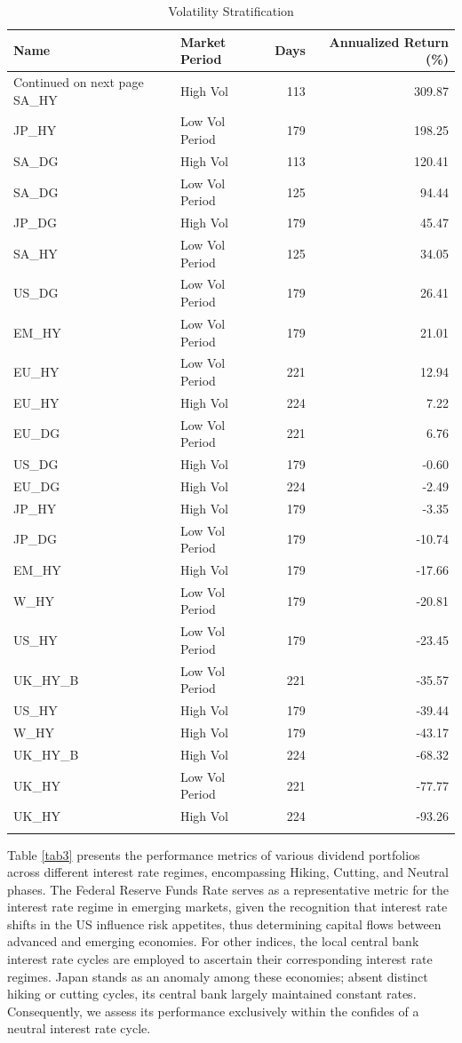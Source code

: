 \documentclass[12pt,preprint, authoryear]{elsarticle}
\numberwithin{equation}{section}
\numberwithin{figure}{section}
\numberwithin{table}{section}
\begin{document}
\begingroup\fontsize{12pt}{13pt}\selectfont
\begin{longtable}{llrr}
  \toprule
Name & Market Period & Days & Annualized Return (\%) \\ 
  \hline 
\endhead 
\hline 
{\footnotesize Continued on next page} 
\endfoot 
\endlastfoot 
 \midrule
SA\_HY & High Vol & 113 & 309.87 \\ 
  JP\_HY & Low Vol Period & 179 & 198.25 \\ 
  SA\_DG & High Vol & 113 & 120.41 \\ 
  SA\_DG & Low Vol Period & 125 & 94.44 \\ 
  JP\_DG & High Vol & 179 & 45.47 \\ 
  SA\_HY & Low Vol Period & 125 & 34.05 \\ 
  US\_DG & Low Vol Period & 179 & 26.41 \\ 
  EM\_HY & Low Vol Period & 179 & 21.01 \\ 
  EU\_HY & Low Vol Period & 221 & 12.94 \\ 
  EU\_HY & High Vol & 224 & 7.22 \\ 
  EU\_DG & Low Vol Period & 221 & 6.76 \\ 
  US\_DG & High Vol & 179 & -0.60 \\ 
  EU\_DG & High Vol & 224 & -2.49 \\ 
  JP\_HY & High Vol & 179 & -3.35 \\ 
  JP\_DG & Low Vol Period & 179 & -10.74 \\ 
  EM\_HY & High Vol & 179 & -17.66 \\ 
  W\_HY & Low Vol Period & 179 & -20.81 \\ 
  US\_HY & Low Vol Period & 179 & -23.45 \\ 
  UK\_HY\_B & Low Vol Period & 221 & -35.57 \\ 
  US\_HY & High Vol & 179 & -39.44 \\ 
  W\_HY & High Vol & 179 & -43.17 \\ 
  UK\_HY\_B & High Vol & 224 & -68.32 \\ 
  UK\_HY & Low Vol Period & 221 & -77.77 \\ 
  UK\_HY & High Vol & 224 & -93.26 \\ 
   \bottomrule
\caption{Volatility Stratification\label{tab2}} 
\end{longtable}
\endgroup

Table \ref{tab3} presents the performance metrics of various dividend
portfolios across different interest rate regimes, encompassing Hiking,
Cutting, and Neutral phases. The Federal Reserve Funds Rate serves as a
representative metric for the interest rate regime in emerging markets,
given the recognition that interest rate shifts in the US influence risk
appetites, thus determining capital flows between advanced and emerging
economies. For other indices, the local central bank interest rate
cycles are employed to ascertain their corresponding interest rate
regimes. Japan stands as an anomaly among these economies; absent
distinct hiking or cutting cycles, its central bank largely maintained
constant rates. Consequently, we assess its performance exclusively
within the confides of a neutral interest rate cycle.
\end{document}
